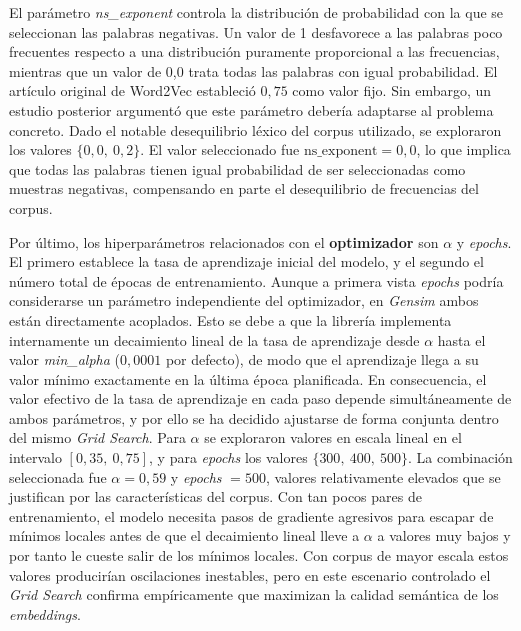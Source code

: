 El parámetro \textit{ns\_exponent} controla la distribución de probabilidad con la que se seleccionan las palabras negativas. Un valor de 1 desfavorece a las palabras poco frecuentes respecto a una distribución puramente proporcional a las frecuencias, mientras que un valor de 0,0 trata todas las palabras con igual probabilidad. El artículo original de Word2Vec \cite{mikolov_skipgram_phrases_2013} estableció $0{,}75$ como valor fijo. Sin embargo, un estudio posterior \cite{caselles_word2vec_hyperparameters_2018} argumentó que este parámetro debería adaptarse al problema concreto. Dado el notable desequilibrio léxico del corpus utilizado, se exploraron los valores $\{0{,}0,\ 0{,}2\}$. El valor seleccionado fue $\text{ns\_exponent} = 0{,}0$, lo que implica que todas las palabras tienen igual probabilidad de ser seleccionadas como muestras negativas, compensando en parte el desequilibrio de frecuencias del corpus.

Por último, los hiperparámetros relacionados con el \textbf{optimizador} son $\alpha$ y \textit{epochs}. El primero establece la tasa de aprendizaje inicial del modelo, y el segundo el número total de épocas de entrenamiento. Aunque a primera vista \textit{epochs} podría considerarse un parámetro independiente del optimizador, en \textit{Gensim} ambos están directamente acoplados. Esto se debe a que la librería implementa internamente un decaimiento lineal de la tasa de aprendizaje desde $\alpha$ hasta el valor \textit{min\_alpha} ($0{,}0001$ por defecto), de modo que el aprendizaje llega a su valor mínimo exactamente en la última época planificada. En consecuencia, el valor efectivo de la tasa de aprendizaje en cada paso depende simultáneamente de ambos parámetros, y por ello se ha decidido ajustarse de forma conjunta dentro del mismo \textit{Grid Search}. Para $\alpha$ se exploraron valores en escala lineal en el intervalo $[0{,}35,\ 0{,}75]$, y para \textit{epochs} los valores $\{300,\ 400,\ 500\}$. La combinación seleccionada fue $\alpha = 0{,}59$ y \textit{epochs} $= 500$, valores relativamente elevados que se justifican por las características del corpus. Con tan pocos pares de entrenamiento, el modelo necesita pasos de gradiente agresivos para escapar de mínimos locales antes de que el decaimiento lineal lleve a $\alpha$ a valores muy bajos y por tanto le cueste salir de los mínimos locales. Con corpus de mayor escala estos valores producirían oscilaciones inestables, pero en este escenario controlado el \textit{Grid Search} confirma empíricamente que maximizan la calidad semántica de los \textit{embeddings}.


